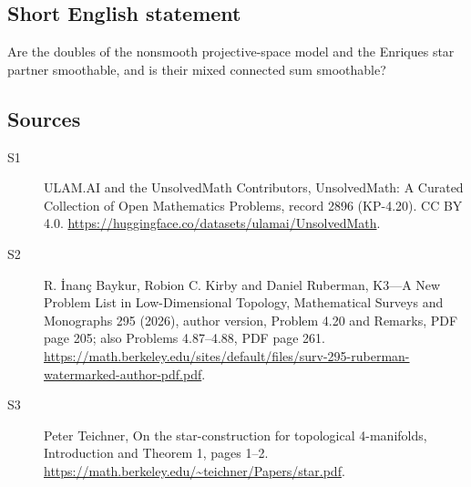 \documentclass[11pt]{article}
\begin{document}
\subsection{Short English statement}
Are the doubles of the nonsmooth projective-space model and the Enriques star partner smoothable, and is their mixed connected sum smoothable?
\subsection{Sources}
\begin{description}
\item[\hypertarget{source:2896:1}{S1}] ULAM.AI and the UnsolvedMath Contributors, UnsolvedMath: A Curated Collection of Open Mathematics Problems, record 2896 (KP-4.20). CC BY 4.0. \url{https://huggingface.co/datasets/ulamai/UnsolvedMath}.
\item[\hypertarget{source:2896:2}{S2}] R. İnanç Baykur, Robion C. Kirby and Daniel Ruberman, K3—A New Problem List in Low-Dimensional Topology, Mathematical Surveys and Monographs 295 (2026), author version, Problem 4.20 and Remarks, PDF page 205; also Problems 4.87--4.88, PDF page 261. \url{https://math.berkeley.edu/sites/default/files/surv-295-ruberman-watermarked-author-pdf.pdf}.
\item[\hypertarget{source:2896:3}{S3}] Peter Teichner, On the star-construction for topological 4-manifolds, Introduction and Theorem 1, pages 1--2. \url{https://math.berkeley.edu/~teichner/Papers/star.pdf}.
\end{description}
\label{end:2896}
\end{document}

